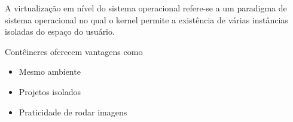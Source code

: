 	
	A virtualização em nível do sistema operacional refere-se a um paradigma de sistema operacional no qual o kernel permite a existência de várias instâncias isoladas do espaço do usuário.
	
	Contêineres oferecem vantagens como
	
	\begin{itemize}
		\item Mesmo ambiente
		\item Projetos isolados
		\item Praticidade de rodar imagens
	\end{itemize}

	
	
	